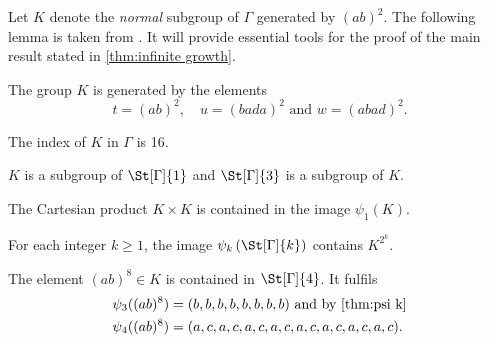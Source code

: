 Let $K$ denote the \emph{normal} subgroup of $\Gamma$ generated by $(ab)^2$. The following lemma is taken from \cite{de2000topics}. It will provide essential tools for the proof of the main result stated in \cref{thm:infinite growth}.
\begin{lem}
\begin{thmlist}
\item The group $K$ is generated by the elements
\begin{equation*}
t=(ab)^2,\quad u=(bada)^2\text{ and }w=(abad)^2.
\end{equation*}
\item The index of $K$ in $\Gamma$ is 16.
\item $K$ is a subgroup of $\St[\Gamma]{1}$ and $\St[\Gamma]{3}$ is a subgroup of $K$.
\item The Cartesian product $K\times K$ is contained in the image $\psi_1(K).$
\item \label{thm:psi k(K)} For each integer $k\geq 1$, the image $\psi_k\left(\St[\Gamma]{k}\right)$ contains $K^{2^k}$.
\item \label{thm:psi4((ab)8)} The element $(ab)^8\in K$ is contained in $\St[\Gamma]{4}$. It fulfils
\begin{align*}
\psi_3((ab)^8)&=(b,b,b,b,b,b,b,b)\text{ and by \cref{thm:psi k}}\\
\psi_4((ab)^8)&=(a,c,a,c,a,c,a,c,a,c,a,c,a,c,a,c).
\end{align*}
\end{thmlist}
\end{lem}
